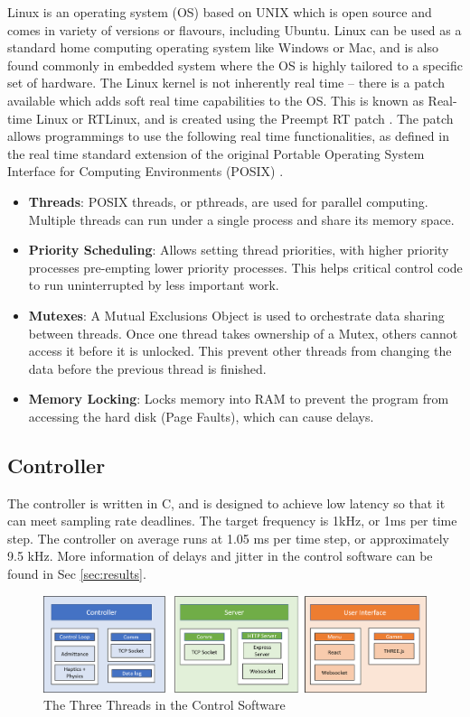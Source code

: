 \documentclass[12pt]{report}
\begin{document}
Linux is an operating system (OS) based on UNIX which is open source and comes in variety of versions or flavours, including Ubuntu. Linux can be used as a standard home computing operating system like Windows or Mac, and is also found commonly in embedded system where the OS is highly tailored to a specific set of hardware. The Linux kernel is not inherently real time -- there is a patch available which adds soft real time capabilities to the OS. This is known as Real-time Linux or RTLinux, and is created using the Preempt RT patch \cite{SebastianSiewior2019}. The patch allows programmings to use the following real time functionalities, as defined in the real time standard extension of the original Portable Operating System Interface for Computing Environments (POSIX) \cite{Obenland}.

\begin{itemize}
	\item \textbf{Threads}: POSIX threads, or pthreads, are used for parallel computing. Multiple threads can run under a single process and share its memory space.
	\item \textbf{Priority Scheduling}: Allows setting thread priorities, with higher priority processes pre-empting lower priority processes. This helps critical control code to run uninterrupted by less important work. 
	\item \textbf{Mutexes}: A Mutual Exclusions Object is used to orchestrate data sharing between threads. Once one thread takes ownership of a Mutex, others cannot access it before it is unlocked. This prevent other threads from changing the data before the previous thread is finished. 
	\item \textbf{Memory Locking}: Locks memory into RAM to prevent the program from accessing the hard disk (Page Faults), which can cause delays. 
\end{itemize}
	
	\subsection{Controller}
	
	The controller is written in C, and is designed to achieve low latency so that it can meet sampling rate deadlines. The target frequency is 1kHz, or 1ms per time step. The controller on average runs at 1.05 ms per time step, or approximately 9.5 kHz. More information of delays and jitter in the control software can be found in Sec \ref{sec:results}. 
	
		\begin{figure}[h] 
		\centering
		\includegraphics[width=\linewidth]{software}
		\caption{The Three Threads in the Control Software}
		\label{fig:software}
	\end{figure} 
	
\end{document}
